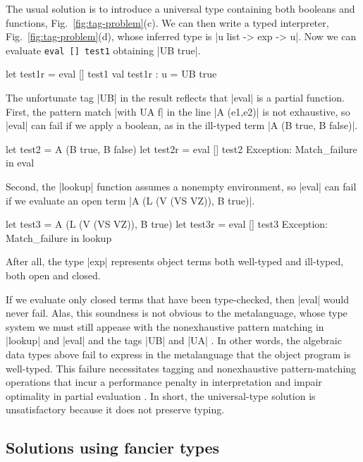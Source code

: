 The usual solution is to introduce a universal type \citep[\S1.3]
{WalidICFP02} containing both booleans and functions\ifshort,
Fig.~\ref{fig:tag-problem}(c)\fi.
\ifshort\else{}\fi
We can then write a typed interpreter\ifshort,
Fig.~\ref{fig:tag-problem}(d), \else{}\fi
whose inferred type is |u list -> exp -> u|. Now we can evaluate
\ifshort
\texttt{eval [] test1} obtaining |UB true|.
\else
\begin{code}
let test1r = eval [] test1
val test1r : u = UB true 
\end{code}
\fi
The unfortunate tag |UB| in the result reflects that |eval| is a partial
function.  
First, the pattern match |with UA f| in the line
|A (e1,e2)| is not exhaustive, so |eval| can fail if we apply a boolean,
as in the ill-typed term |A (B true, B false)|.
\ifshort\else
\begin{code}
let test2 = A (B true, B false)
let test2r = eval [] test2
Exception: Match_failure in eval
\end{code}
\fi
Second, the |lookup|
function assumes a nonempty environment, so |eval| can fail if we
evaluate an open term
\ifshort
|A (L (V (VS VZ)), B true)|.
\else
\begin{code}
let test3 = A (L (V (VS VZ)), B true)
let test3r = eval [] test3
Exception: Match_failure in lookup
\end{code}
\fi
After all, the type |exp| represents object
terms both well-typed and ill-typed, both open and closed.

If we evaluate only closed terms that have been type-checked, then
|eval| would never fail. Alas, this soundness is not obvious to the
metalanguage, whose type system we must still appease with the
nonexhaustive pattern matching in |lookup| and |eval| and the tags |UB|
and |UA| \citep[\S1.4]{WalidICFP02}.  In other words, the algebraic data
types above fail to express in the metalanguage that the object program
is well-typed.  This failure necessitates tagging and nonexhaustive
pattern\hyp matching operations that incur a performance penalty in
interpretation \citep{WalidICFP02} and impair optimality in partial evaluation
\citep{taha-tag}.  In short, the universal\hyp type solution is
unsatisfactory because it does not preserve typing.

\ifshort\else\subsection{Solutions using fancier types}\fi

